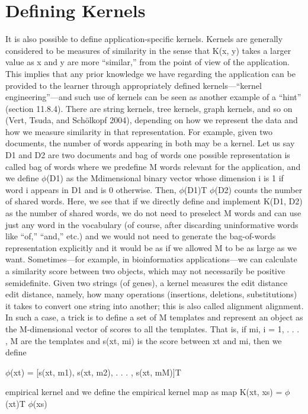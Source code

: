 \section{Defining Kernels}

It is also possible to define application-specific kernels. Kernels are generally considered to be measures of similarity in the sense that K(x, y) takes a larger value as x and y are more “similar,” from the point of view of the application. This implies that any prior knowledge we have regarding the application can be provided to the learner through appropriately defined kernels---“kernel engineering”---and such use of kernels can be seen as another example of a “hint” (section 11.8.4). There are string kernels, tree kernels, graph kernels, and so on (Vert, Tsuda, and Schölkopf 2004), depending on how we represent the data and how we measure similarity in that representation. For example, given two documents, the number of words appearing in both may be a kernel. Let us say D1 and D2 are two documents and bag of words one possible representation is called bag of words where we predefine M words relevant for the application, and we define $\phi$(D1) as the Mdimensional binary vector whose dimension i is 1 if word i appears in D1 and is 0 otherwise. Then, $\phi$(D1)T $\phi$(D2) counts the number of shared words. Here, we see that if we directly define and implement K(D1, D2) as the number of shared words, we do not need to preselect M words and can use just any word in the vocabulary (of course, after discarding uninformative words like “of,” “and,” etc.) and we would not need to generate the bag-of-words representation explicitly and it would be as if we allowed M to be as large as we want. Sometimes---for example, in bioinformatics applications---we can calculate a similarity score between two objects, which may not necessarily be positive semidefinite. Given two strings (of genes), a kernel measures the edit distance edit distance, namely, how many operations (insertions, deletions, substitutions) it takes to convert one string into another; this is also called alignment alignment. In such a case, a trick is to define a set of M templates and represent an object as the M-dimensional vector of scores to all the templates. That is, if mi, i = 1, . . . , M are the templates and s(xt, mi) is the score between xt and mi, then we define

$\phi$(xt) = [s(xt, m1), s(xt, m2), . . . , s(xt, mM)]T

empirical kernel and we define the empirical kernel map as map K(xt, xs) = $\phi$(xt)T $\phi$(xs)

